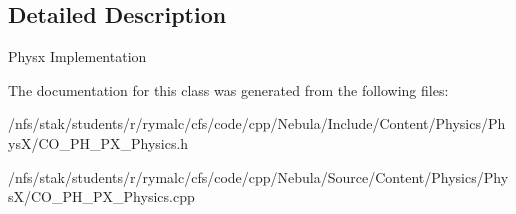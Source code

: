\subsection{Detailed Description}
Physx Implementation 

The documentation for this class was generated from the following files:\begin{DoxyCompactItemize}
\item 
/nfs/stak/students/r/rymalc/cfs/code/cpp/Nebula/Include/Content/Physics/PhysX/CO\_\-PH\_\-PX\_\-Physics.h\item 
/nfs/stak/students/r/rymalc/cfs/code/cpp/Nebula/Source/Content/Physics/PhysX/CO\_\-PH\_\-PX\_\-Physics.cpp\end{DoxyCompactItemize}
